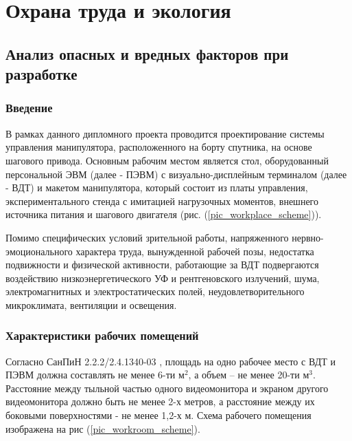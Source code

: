 \newpage
\section{Охрана труда и экология}

\subsection{Анализ опасных и вредных факторов при разработке}

\subsubsection{Введение}

В рамках данного дипломного проекта проводится проектирование системы управления
манипулятора, расположенного на борту спутника, на основе шагового привода.
Основным рабочим местом является стол, оборудованный персональной ЭВМ
(далее - ПЭВМ) с визуально-дисплейным терминалом (далее - ВДТ) и макетом
манипулятора, который состоит из платы управления, экспериментального стенда с
имитацией нагрузочных моментов, внешнего источника питания и шагового двигателя
(рис. (\ref{pic_workplace_scheme})).

Помимо специфических условий зрительной работы, напряженного
нервно-эмоционального характера труда, вынужденной рабочей позы, недостатка
подвижности и физической активности, работающие за ВДТ подвергаются воздействию
низкоэнергетического УФ и рентгеновского излучений, шума, электромагнитных и
электростатических полей, неудовлетворительного микроклимата, вентиляции и
освещения.

\subsubsection{Характеристики рабочих помещений}

Согласно СанПиН 2.2.2/2.4.1340-03 \cite{ecology_sanpin_1340_03}, площадь на одно
рабочее место с ВДТ и ПЭВМ должна составлять не менее 6-ти $\text{м}^2$, а объем
– не менее 20-ти $\text{м}^3$. Расстояние между тыльной частью одного видеомонитора
и экраном другого видеомонитора должно быть не менее 2-х метров, а расстояние
между их боковыми поверхностями - не менее 1,2-х м. Схема рабочего помещения
изображена на рис (\ref{pic_workroom_scheme}).

